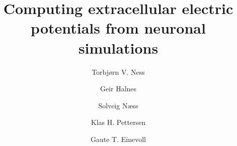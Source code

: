 \documentclass[preprint,11pt,authoryear]{elsarticle}
\begin{document}
\begin{frontmatter}


\title{Computing extracellular electric potentials from neuronal simulations} 



\author{Torbj\o{}rn V. Ness }
\author{Geir Halnes }
\author{Solveig N\ae{}ss}
\author{Klas H. Pettersen }
\author{Gaute T. Einevoll}

\address[label1]{Faculty of Science and Technology, Norwegian University of Life Sciences, {{\AA}}s, Norway}
\address[label2]{Center for Integrative Neuroplasticity, University of Oslo, Oslo, Norway}
\address[label3]{Norwegian Artificial Intelligence Research Consortium, Oslo, Norway}
\address[label4]{Department of Physics, University of Oslo, Oslo, Norway}





\end{frontmatter}
\end{document}
